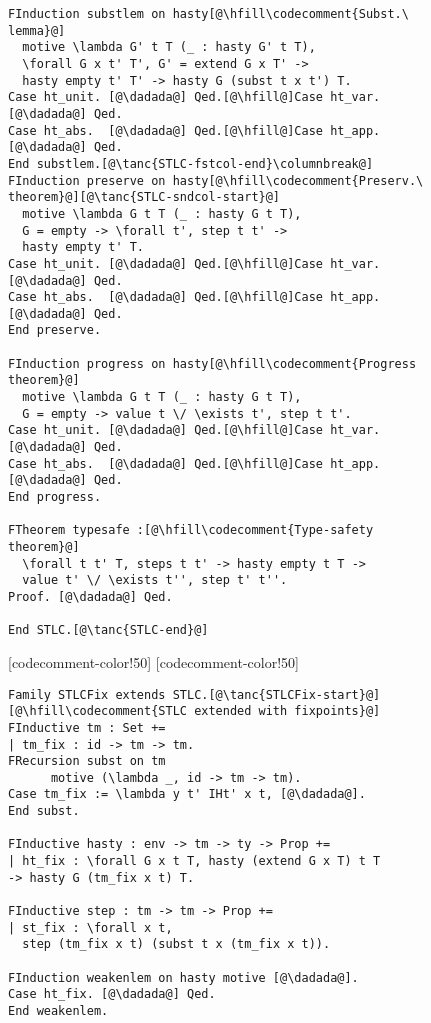 \begin{figure}
\begin{minipage}{\textwidth}
\begin{multicols}{2}
\begin{lstlisting}
FInduction substlem on hasty[@\hfill\codecomment{Subst.\ lemma}@]
  motive \lambda G' t T (_ : hasty G' t T),
  \forall G x t' T', G' = extend G x T' ->
  hasty empty t' T' -> hasty G (subst t x t') T.
Case ht_unit. [@\dadada@] Qed.[@\hfill@]Case ht_var. [@\dadada@] Qed.
Case ht_abs.  [@\dadada@] Qed.[@\hfill@]Case ht_app. [@\dadada@] Qed.
End substlem.[@\tanc{STLC-fstcol-end}\columnbreak@]
FInduction preserve on hasty[@\hfill\codecomment{Preserv.\ theorem}@][@\tanc{STLC-sndcol-start}@]
  motive \lambda G t T (_ : hasty G t T),
  G = empty -> \forall t', step t t' -> 
  hasty empty t' T.
Case ht_unit. [@\dadada@] Qed.[@\hfill@]Case ht_var. [@\dadada@] Qed.
Case ht_abs.  [@\dadada@] Qed.[@\hfill@]Case ht_app. [@\dadada@] Qed.
End preserve.

FInduction progress on hasty[@\hfill\codecomment{Progress theorem}@]
  motive \lambda G t T (_ : hasty G t T),
  G = empty -> value t \/ \exists t', step t t'.
Case ht_unit. [@\dadada@] Qed.[@\hfill@]Case ht_var. [@\dadada@] Qed.
Case ht_abs.  [@\dadada@] Qed.[@\hfill@]Case ht_app. [@\dadada@] Qed.
End progress.

FTheorem typesafe :[@\hfill\codecomment{Type-safety theorem}@]
  \forall t t' T, steps t t' -> hasty empty t T ->
  value t' \/ \exists t'', step t' t''.
Proof. [@\dadada@] Qed.

End STLC.[@\tanc{STLC-end}@]
\end{lstlisting}

[codecomment-color!50]
[codecomment-color!50]

\vspace{-8pt}


\begin{lstlisting}[firstnumber=77]
Family STLCFix extends STLC.[@\tanc{STLCFix-start}@]
[@\hfill\codecomment{STLC extended with fixpoints}@]
FInductive tm : Set +=
| tm_fix : id -> tm -> tm.
FRecursion subst on tm 
      motive (\lambda _, id -> tm -> tm).
Case tm_fix := \lambda y t' IHt' x t, [@\dadada@].
End subst.

FInductive hasty : env -> tm -> ty -> Prop +=
| ht_fix : \forall G x t T, hasty (extend G x T) t T 
-> hasty G (tm_fix x t) T.

FInductive step : tm -> tm -> Prop +=
| st_fix : \forall x t,
  step (tm_fix x t) (subst t x (tm_fix x t)).

FInduction weakenlem on hasty motive [@\dadada@].
Case ht_fix. [@\dadada@] Qed.
End weakenlem.


\end{lstlisting}
\end{multicols}
\end{minipage}
\end{figure}
